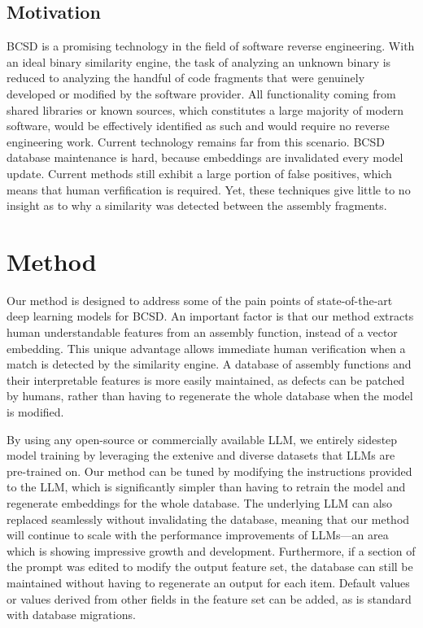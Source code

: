 \subsection{Motivation}

BCSD is a promising technology in the field of software reverse engineering. With an ideal binary similarity engine,
the task of analyzing an unknown binary is reduced to analyzing the handful of code fragments that were genuinely developed
or modified by the software provider. All functionality coming from shared libraries or known sources, which constitutes a
large majority of modern software, would be effectively identified as such and would require no reverse engineering work.
Current technology remains far from this scenario. BCSD database maintenance is hard, because embeddings are invalidated
every model update. Current methods still exhibit a large portion of false positives, which means that human verfification
is required. Yet, these techniques give little to no insight as to why a similarity was detected between the assembly fragments.


\section{Method}

Our method is designed to address some of the pain points of state-of-the-art deep learning models for BCSD.
An important factor is that our method extracts human understandable features from an assembly function, instead
of a vector embedding. This unique advantage allows immediate human verification when a match is detected by the similarity
engine. A database of assembly functions and their interpretable features is more easily maintained, as defects can
be patched by humans, rather than having to regenerate the whole database when the model is modified.

By using any open-source or commercially available LLM, we entirely sidestep model training by leveraging the extenive
and diverse datasets that LLMs are pre-trained on.  Our method can be tuned by modifying the instructions provided to
the LLM, which is significantly simpler than having to retrain the model and regenerate embeddings for the whole database.
The underlying LLM can also replaced seamlessly without invalidating the database, meaning that our method will continue
to scale with the performance improvements of LLMs---an area which is showing impressive growth and development. Furthermore, if
a section of the prompt was edited to modify the output feature set, the database can still be maintained without
having to regenerate an output for each item. Default values or values derived from other fields in the feature set can be added,
as is standard with database migrations.


